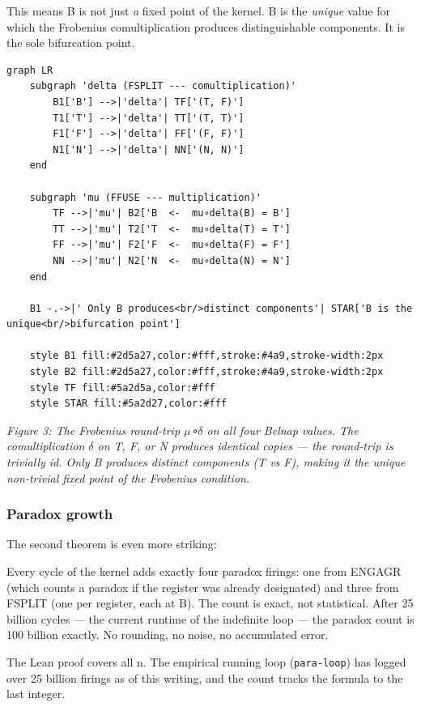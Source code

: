 \documentclass[12pt,a4paper]{article}
\begin{document}
This means B is not just \emph{a} fixed point of the kernel. B is the \emph{unique} value for which the Frobenius comultiplication produces distinguishable components. It is the sole bifurcation point.

\begin{lstlisting}[language=mermaid]
graph LR
    subgraph 'delta (FSPLIT --- comultiplication)'
        B1['B'] -->|'delta'| TF['(T, F)']
        T1['T'] -->|'delta'| TT['(T, T)']
        F1['F'] -->|'delta'| FF['(F, F)']
        N1['N'] -->|'delta'| NN['(N, N)']
    end

    subgraph 'mu (FFUSE --- multiplication)'
        TF -->|'mu'| B2['B  <-  mu∘delta(B) = B']
        TT -->|'mu'| T2['T  <-  mu∘delta(T) = T']
        FF -->|'mu'| F2['F  <-  mu∘delta(F) = F']
        NN -->|'mu'| N2['N  <-  mu∘delta(N) = N']
    end

    B1 -.->|' Only B produces<br/>distinct components'| STAR['B is the unique<br/>bifurcation point']

    style B1 fill:#2d5a27,color:#fff,stroke:#4a9,stroke-width:2px
    style B2 fill:#2d5a27,color:#fff,stroke:#4a9,stroke-width:2px
    style TF fill:#5a2d5a,color:#fff
    style STAR fill:#5a2d27,color:#fff
\end{lstlisting}

\emph{Figure 3: The Frobenius round-trip $\mu$∘$\delta$ on all four Belnap values. The comultiplication $\delta$ on T, F, or N produces identical copies --- the round-trip is trivially id. Only B produces distinct components (T vs F), making it the unique non-trivial fixed point of the Frobenius condition.}

\subsubsection{Paradox growth}

The second theorem is even more striking:

Every cycle of the kernel adds exactly four paradox firings: one from ENGAGR (which counts a paradox if the register was already designated) and three from FSPLIT (one per register, each at B). The count is exact, not statistical. After 25 billion cycles --- the current runtime of the indefinite loop --- the paradox count is 100 billion exactly. No rounding, no noise, no accumulated error.

The Lean proof covers all n. The empirical running loop (\texttt{para-loop}) has logged over 25 billion firings as of this writing, and the count tracks the formula to the last integer.
\end{document}
